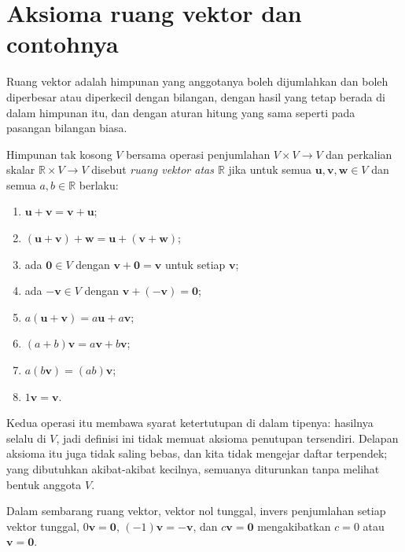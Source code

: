 \section{Aksioma ruang vektor dan contohnya}

Ruang vektor adalah himpunan yang anggotanya boleh dijumlahkan dan boleh diperbesar atau
diperkecil dengan bilangan, dengan hasil yang tetap berada di dalam himpunan itu, dan dengan
aturan hitung yang sama seperti pada pasangan bilangan biasa.

\begin{definisi}
Himpunan tak kosong $V$ bersama operasi penjumlahan $V\times V\to V$ dan perkalian skalar
$\mathbb{R}\times V\to V$ disebut \emph{ruang vektor atas $\mathbb{R}$} jika untuk semua
$\mathbf{u},\mathbf{v},\mathbf{w}\in V$ dan semua $a,b\in\mathbb{R}$ berlaku:
\begin{enumerate}
  \item $\mathbf{u}+\mathbf{v}=\mathbf{v}+\mathbf{u}$;
  \item $(\mathbf{u}+\mathbf{v})+\mathbf{w}=\mathbf{u}+(\mathbf{v}+\mathbf{w})$;
  \item ada $\mathbf{0}\in V$ dengan $\mathbf{v}+\mathbf{0}=\mathbf{v}$ untuk setiap
        $\mathbf{v}$;
  \item ada $-\mathbf{v}\in V$ dengan $\mathbf{v}+(-\mathbf{v})=\mathbf{0}$;
  \item $a(\mathbf{u}+\mathbf{v})=a\mathbf{u}+a\mathbf{v}$;
  \item $(a+b)\mathbf{v}=a\mathbf{v}+b\mathbf{v}$;
  \item $a(b\mathbf{v})=(ab)\mathbf{v}$;
  \item $1\mathbf{v}=\mathbf{v}$.
\end{enumerate}
\end{definisi}

Kedua operasi itu membawa syarat ketertutupan di dalam tipenya: hasilnya selalu di $V$, jadi
definisi ini tidak memuat aksioma penutupan tersendiri. Delapan aksioma itu juga tidak saling
bebas, dan kita tidak mengejar daftar terpendek; yang dibutuhkan akibat-akibat kecilnya,
semuanya diturunkan tanpa melihat bentuk anggota $V$.

\begin{lemma}
Dalam sembarang ruang vektor, vektor nol tunggal, invers penjumlahan setiap vektor tunggal,
$0\mathbf{v}=\mathbf{0}$, $(-1)\mathbf{v}=-\mathbf{v}$, dan $c\mathbf{v}=\mathbf{0}$
mengakibatkan $c=0$ atau $\mathbf{v}=\mathbf{0}$.
\end{lemma}

